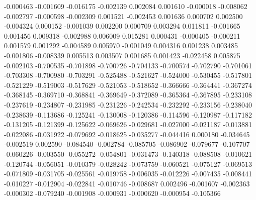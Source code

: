 -0.000463
-0.001609
-0.016175
-0.002139
0.002084
0.001610
-0.000018
-0.008062
-0.002797
-0.000598
-0.002309
0.001521
-0.002453
0.001636
0.000702
0.002500
-0.004324
0.000152
-0.001039
0.002200
0.000709
0.003294
0.011811
-0.001665
0.001456
0.009318
-0.002988
0.006009
0.015281
0.000431
-0.000405
-0.000211
0.001579
0.001292
-0.004589
0.005970
-0.001049
0.004316
0.001238
0.003485
-0.001806
-0.008339
0.005513
0.003507
0.001685
0.001423
-0.022458
0.005875
-0.002103
-0.700535
-0.701898
-0.700726
-0.704133
-0.700574
-0.702790
-0.701061
-0.703308
-0.700980
-0.703291
-0.525488
-0.521627
-0.524000
-0.530455
-0.517801
-0.521229
-0.519003
-0.517629
-0.521053
-0.518652
-0.366666
-0.364441
-0.367274
-0.368145
-0.369710
-0.368841
-0.369649
-0.372089
-0.365364
-0.367895
-0.233108
-0.237619
-0.234807
-0.231985
-0.231226
-0.242534
-0.232292
-0.233156
-0.238040
-0.238639
-0.113686
-0.125241
-0.130008
-0.120386
-0.114596
-0.120987
-0.117182
-0.131205
-0.121399
-0.125622
-0.069626
-0.029681
-0.027000
-0.021187
-0.013881
-0.022086
-0.031922
-0.079692
-0.018625
-0.035277
-0.044416
0.000180
-0.034645
-0.002519
0.002590
-0.084540
-0.002784
-0.085705
-0.086902
-0.079677
-0.107707
-0.060226
-0.003550
-0.055272
-0.054801
-0.031473
-0.140318
-0.088508
-0.010621
-0.120744
-0.056051
-0.010379
-0.028242
-0.073759
-0.060521
-0.075127
-0.069513
-0.071809
-0.031705
-0.025561
-0.019758
-0.006035
-0.012226
-0.007435
-0.008441
-0.010227
-0.012904
-0.022841
-0.010746
-0.008687
0.002496
-0.001607
-0.002363
-0.000302
-0.079240
-0.001908
-0.000931
-0.000620
-0.000954
-0.105366
